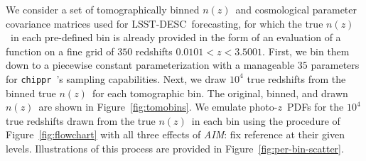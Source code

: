 \documentclass[iop]{emulateapj}
\newcommand{\todo}[3]{{\color{#2}\emph{#1}: #3}}
\newcommand{\aim}[1]{\todo{AIM}{red}{#1}}
\newcommand{\Fig}[1]{Figure~\ref{#1}}
\newcommand{\project}[1]{{\textsc{#1}}}
\newcommand{\lsst}{\project{LSST}}
\newcommand{\desc}{\lsst-\project{DESC}}
\newcommand{\repo}[1]{{\texttt{#1}}~}
\newcommand{\chippr}{\repo{chippr}}
\newcommand{\nz}{$n(z)$}
\newcommand{\pz}{photo-$z$~}
\newcommand{\pzpdf}{\pz PDF}
\begin{document}
We consider a set of tomographically binned \nz\ and cosmological parameter covariance matrices used for \desc\ forecasting, for which the true \nz\ in each pre-defined bin is already provided in the form of an evaluation of a function on a fine grid of $350$ redshifts $0.0101 < z < 3.5001$.
First, we bin them down to a piecewise constant parameterization with a manageable $35$ parameters for \chippr's sampling capabilities.
Next, we draw $10^{4}$ true redshifts from the binned true \nz\ for each tomographic bin.
The original, binned, and drawn \nz\ are shown in \Fig{fig:tomobins}.
We emulate \pzpdf s for the $10^{4}$ true redshifts drawn from the true \nz\ in each bin using the procedure of \Fig{fig:flowchart} with all three effects of \aim{fix reference}
at their given levels.
Illustrations of this process are provided in \Fig{fig:per-bin-scatter}.
\end{document}
